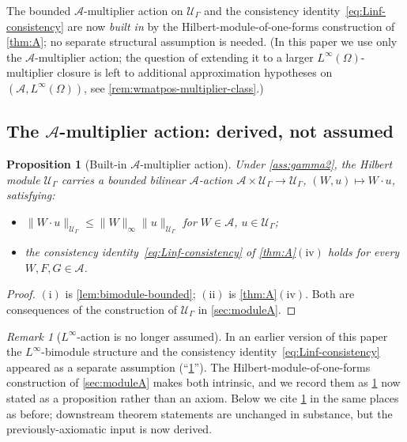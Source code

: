 \documentclass[11pt,reqno]{amsart}
\theoremstyle{plain}
\newtheorem{proposition}[theorem]{Proposition}
\theoremstyle{definition}
\theoremstyle{remark}
\newtheorem{remark}[theorem]{Remark}
\newcommand{\cA}{\mathcal A}
\newcommand{\cU}{\mathcal U}
\begin{document}
The bounded $\cA$-multiplier action on $\cU_{\Gamma}$ and the
consistency identity~\eqref{eq:Linf-consistency} are now
\emph{built in} by the Hilbert-module-of-one-forms construction
of \cref{thm:A}; no separate structural assumption is needed.
(In this paper we use only the $\cA$-multiplier action; the
question of extending it to a larger
$L^{\infty}(\Omega)$-multiplier closure is left to additional
approximation hypotheses on $(\cA,L^{\infty}(\Omega))$, see
\cref{rem:wmatpos-multiplier-class}.)

\subsection{The \texorpdfstring{$\cA$}{A}-multiplier action: derived, not assumed}\label{sec:leibniz-Linf}

\begin{proposition}[Built-in $\cA$-multiplier action]\label{ass:Linf-module}
Under \cref{ass:gamma2}, the Hilbert module $\cU_{\Gamma}$
carries a bounded bilinear $\cA$-action
$\cA\times\cU_{\Gamma}\to\cU_{\Gamma}$,
$(W,u)\mapsto W\cdot u$, satisfying:
\begin{itemize}
\item[$(\mathrm i)$] $\|W\cdot u\|_{\cU_{\Gamma}}\le
\|W\|_{\infty}\|u\|_{\cU_{\Gamma}}$ for $W\in\cA$,
$u\in\cU_{\Gamma}$;
\item[$(\mathrm{ii})$] the consistency
identity~\eqref{eq:Linf-consistency} of \cref{thm:A}$(\mathrm{iv})$
holds for every $W,F,G\in\cA$.
\end{itemize}
\end{proposition}

\begin{proof}
$(\mathrm i)$ is \cref{lem:bimodule-bounded}; $(\mathrm{ii})$
is \cref{thm:A}$(\mathrm{iv})$. Both are consequences of the
construction of $\cU_{\Gamma}$ in \cref{sec:moduleA}.
\end{proof}

\begin{remark}[$L^{\infty}$-action is no longer assumed]\label{rem:Linf-now-derived}
In an earlier version of this paper the
$L^{\infty}$-bimodule structure and the consistency
identity~\eqref{eq:Linf-consistency} appeared as a separate
assumption (``\cref{ass:Linf-module}''). The
Hilbert-module-of-one-forms construction of \cref{sec:moduleA}
makes both intrinsic, and we record them as
\cref{ass:Linf-module} now stated as a proposition rather than
an axiom. Below we cite \cref{ass:Linf-module} in the same
places as before; downstream theorem statements are unchanged in
substance, but the previously-axiomatic input is now derived.
\end{remark}
\end{document}
